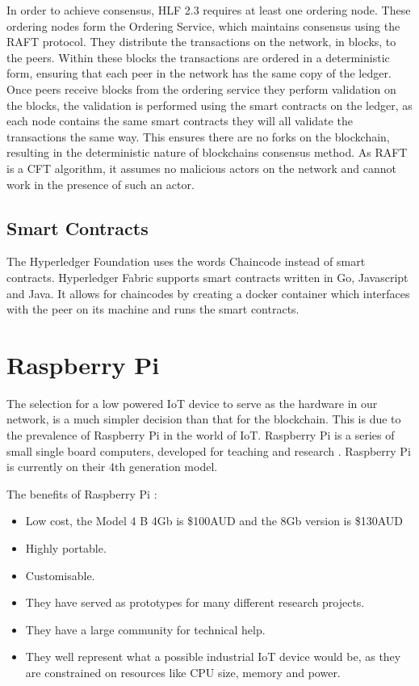 In order to achieve consensus, HLF 2.3 requires at least one ordering node. These ordering nodes form the Ordering Service, which maintains consensus using the RAFT protocol. They distribute the transactions on the network, in blocks, to the peers. Within these blocks the transactions are ordered in a deterministic form, ensuring that each peer in the network has the same copy of the ledger. Once peers receive blocks from the ordering service they perform validation on the blocks, the validation is performed using the smart contracts on the ledger, as each node contains the same smart contracts they will all validate the transactions the same way. This ensures there are no forks on the blockchain, resulting in the deterministic nature of blockchains consensus method. As RAFT is a CFT algorithm, it assumes no malicious actors on the network and cannot work in the presence of such an actor.

\subsection{Smart Contracts}
The Hyperledger Foundation uses the words Chaincode instead of smart contracts.
Hyperledger Fabric supports smart contracts written in Go, Javascript and Java. It allows for chaincodes by creating a docker container which interfaces with the peer on its machine and runs the smart contracts. 



\section{Raspberry Pi}

The selection for a low powered IoT device to serve as the hardware in our network, is a much simpler decision than that for the blockchain. This is due to the prevalence of Raspberry Pi in the world of IoT. Raspberry Pi is a series of small single board computers, developed for teaching and research \cite{Raspberry}. Raspberry Pi is currently on their 4th generation model. 

The benefits of Raspberry Pi :

\begin{itemize}
    \item Low cost, the Model 4 B 4Gb is \$100AUD and the 8Gb version is \$130AUD
    \item Highly portable.
    \item Customisable.
    \item They have served as prototypes for many different research projects.
    \item They have a large community for technical help.
    \item They well represent what a possible industrial IoT device would be, as they are constrained on resources like CPU size, memory and power.
\end{itemize}

